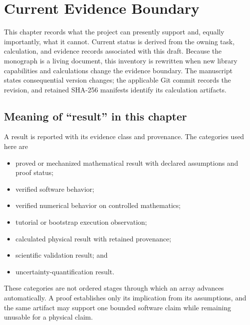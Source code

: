 \chapter{Current Evidence Boundary}

\label{ch:results-and-limitations}


This chapter records what the project can presently support and, equally
importantly, what it cannot. Current status is derived from the owning task,
calculation, and evidence records associated with this draft. Because the
monograph is a living document, this inventory is rewritten when new library
capabilities and calculations change the evidence boundary. The manuscript
states consequential version changes; the applicable Git commit records the
revision, and retained SHA-256 manifests identify its calculation artifacts.

\section{Meaning of ``result'' in this chapter}

A result is reported with its evidence class and provenance. The categories used
here are

\begin{itemize}
  \item proved or mechanized mathematical result with declared assumptions and
    proof status;
  \item verified software behavior;
  \item verified numerical behavior on controlled mathematics;
  \item tutorial or bootstrap execution observation;
  \item calculated physical result with retained provenance;
  \item scientific validation result; and
  \item uncertainty-quantification result.
\end{itemize}

These categories are not ordered stages through which an array advances
automatically. A proof establishes only its implication from its assumptions,
and the same artifact may support one bounded software claim while
remaining unusable for a physical claim.


